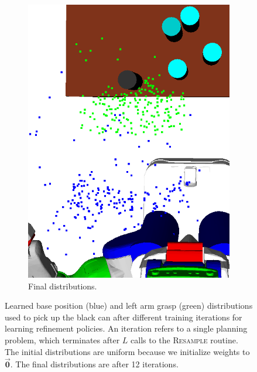 \begin{figure}[t]
\begin{subfigure}[b]{0.35\linewidth}
    \includegraphics[width=\textwidth]{images/learn12.png}
    \caption{Final distributions.}
  \end{subfigure}
  \caption{\small{Learned base position (blue) and left arm grasp (green) distributions used to
pick up the black can after different training iterations for learning refinement policies.
An iteration refers to a single planning problem,
which terminates after $L$ calls to the \textsc{Resample} routine. The
initial distributions are uniform because we initialize weights to $\vec{\mathbf{0}}$.
The final distributions are after 12 iterations.}}
  \label{fig:training}
\end{figure}

